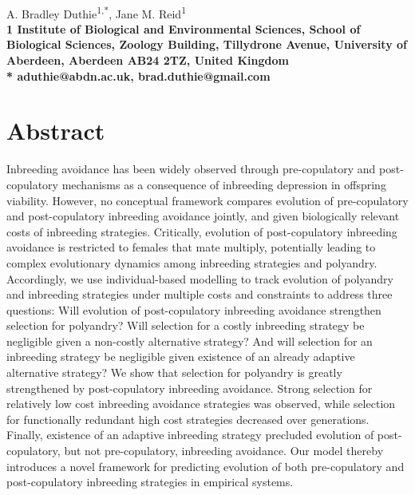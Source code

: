 \documentclass[10pt,letterpaper]{article}
\begin{document}
\vspace*{0.35in}

\begin{flushleft}
{\LARGE
\textbf{}
}
\newline
\\
A. Bradley Duthie\textsuperscript{1,*},
Jane M. Reid\textsuperscript{1}
\\
\bigskip
\bf{1} Institute of Biological and Environmental Sciences, School of Biological Sciences, Zoology Building, Tillydrone Avenue, University of Aberdeen, Aberdeen AB24 2TZ, United Kingdom
\\
\bigskip
*  aduthie@abdn.ac.uk, brad.duthie@gmail.com

\end{flushleft}

\section*{Abstract}
Inbreeding avoidance has been widely observed through pre-copulatory and post-copulatory mechanisms as a consequence of inbreeding depression in offspring viability. However, no conceptual framework compares evolution of pre-copulatory and post-copulatory inbreeding avoidance jointly, and given biologically relevant costs of inbreeding strategies. Critically, evolution of post-copulatory inbreeding avoidance is restricted to females that mate multiply, potentially leading to complex evolutionary dynamics among inbreeding strategies and polyandry. Accordingly, we use individual-based modelling to track evolution of polyandry and inbreeding strategies under multiple costs and constraints to address three questions: Will evolution of post-copulatory inbreeding avoidance strengthen selection for polyandry? Will selection for a costly inbreeding strategy be negligible given a non-costly alternative strategy? And will selection for an inbreeding strategy be negligible given existence of an already adaptive alternative strategy? We show that selection for polyandry is greatly strengthened by post-copulatory inbreeding avoidance. Strong selection for relatively low cost inbreeding avoidance strategies was observed, while selection for functionally redundant high cost strategies decreased over generations. Finally, existence of an adaptive inbreeding strategy precluded evolution of post-copulatory, but not pre-copulatory, inbreeding avoidance. Our model thereby introduces a novel framework for predicting evolution of both pre-copulatory and post-copulatory inbreeding strategies in empirical systems.
\end{document}

